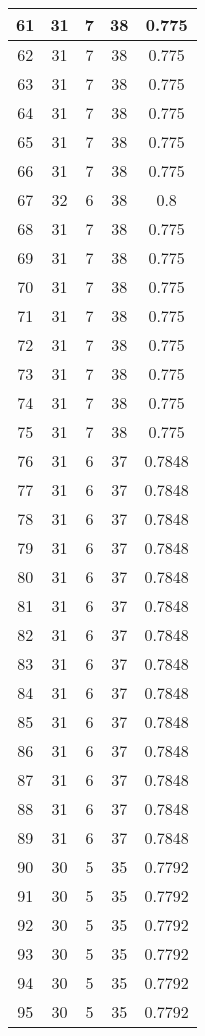 \documentclass[letterpaper, 12pt]{article}
\begin{document}
\begin{longtable}{|c|c|c|c|c|}
61 & 31 & 7 & 38 & 0.775 \\
\hline
62 & 31 & 7 & 38 & 0.775 \\
\hline
63 & 31 & 7 & 38 & 0.775 \\
\hline
64 & 31 & 7 & 38 & 0.775 \\
\hline
65 & 31 & 7 & 38 & 0.775 \\
\hline
66 & 31 & 7 & 38 & 0.775 \\
\hline
67 & 32 & 6 & 38 & 0.8 \\
\hline
68 & 31 & 7 & 38 & 0.775 \\
\hline
69 & 31 & 7 & 38 & 0.775 \\
\hline
70 & 31 & 7 & 38 & 0.775 \\
\hline
71 & 31 & 7 & 38 & 0.775 \\
\hline
72 & 31 & 7 & 38 & 0.775 \\
\hline
73 & 31 & 7 & 38 & 0.775 \\
\hline
74 & 31 & 7 & 38 & 0.775 \\
\hline
75 & 31 & 7 & 38 & 0.775 \\
\hline
76 & 31 & 6 & 37 & 0.7848 \\
\hline
77 & 31 & 6 & 37 & 0.7848 \\
\hline
78 & 31 & 6 & 37 & 0.7848 \\
\hline
79 & 31 & 6 & 37 & 0.7848 \\
\hline
80 & 31 & 6 & 37 & 0.7848 \\
\hline
81 & 31 & 6 & 37 & 0.7848 \\
\hline
82 & 31 & 6 & 37 & 0.7848 \\
\hline
83 & 31 & 6 & 37 & 0.7848 \\
\hline
84 & 31 & 6 & 37 & 0.7848 \\
\hline
85 & 31 & 6 & 37 & 0.7848 \\
\hline
86 & 31 & 6 & 37 & 0.7848 \\
\hline
87 & 31 & 6 & 37 & 0.7848 \\
\hline
88 & 31 & 6 & 37 & 0.7848 \\
\hline
89 & 31 & 6 & 37 & 0.7848 \\
\hline
90 & 30 & 5 & 35 & 0.7792 \\
\hline
91 & 30 & 5 & 35 & 0.7792 \\
\hline
92 & 30 & 5 & 35 & 0.7792 \\
\hline
93 & 30 & 5 & 35 & 0.7792 \\
\hline
94 & 30 & 5 & 35 & 0.7792 \\
\hline
95 & 30 & 5 & 35 & 0.7792 \\

\end{longtable}
\end{document}
